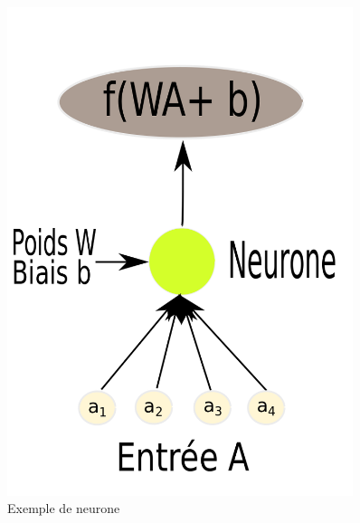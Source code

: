 \documentclass[a4paper, 11pt, onecolumn]{article}
\begin{document}
\begin{figure}[!tbp]
\centering  
  \begin{minipage}[b]{0.3\textwidth}
    \includegraphics[width=0.9\textwidth]{Neuron}
    \caption{Exemple de neurone}
  \end{minipage}
  \hfill
  \begin{minipage}[b]{0.3\textwidth}

\end{minipage}
\end{figure}
\end{document}
